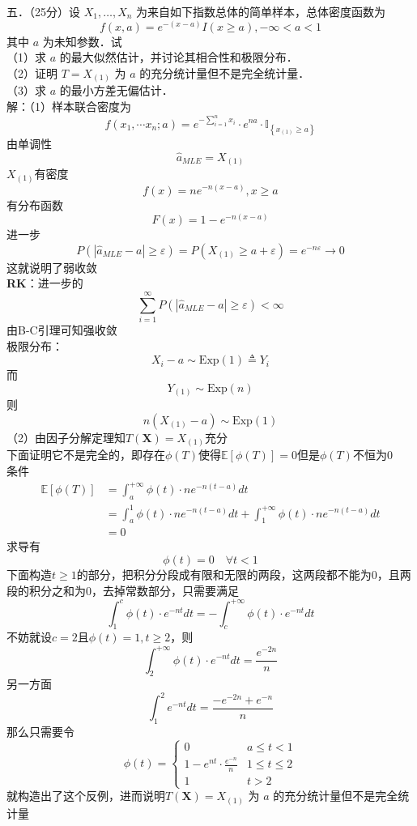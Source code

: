 \documentclass[UTF8]{ctexart}
\begin{document}
\noindent 五．（25分）设 $X_1, \ldots, X_n$ 为来自如下指数总体的简单样本，总体密度函数为
$$
f(x , a)=e^{-(x-a)} I(x \geq a),-\infty<a<1
$$
其中 $a$ 为未知参数．试\\
（1）求 $a$ 的最大似然估计，并讨论其相合性和极限分布．\\
（2）证明 $T=X_{(1)}$ 为 $a$ 的充分统计量但不是完全统计量．\\
（3）求 $a$ 的最小方差无偏估计．\\
解：（1）样本联合密度为
\[
f\left(x_1, \cdots x_n ; a\right)=e^{-\sum_{i=1}^n x_i} \cdot e^{n a} \cdot \mathbb{I}_{\left\{x_{(1)} \geq a\right\}}
\]
由单调性
\[
\hat{a}_{MLE}=X_{(1)}
\]
$X_{(1)}$有密度
\[
f(x)=ne^{-n(x-a)},x\ge a
\]
有分布函数
\[
F(x)=1-e^{-n(x-a)}
\]
进一步
\[
P\left(\left|\hat{a}_{M L E}-a\right| \geqslant \varepsilon\right)=P(X_{(1)} \geqslant a+\varepsilon)=e^{-n \varepsilon} \rightarrow 0
\]
这就说明了弱收敛\\
\textbf{RK}：进一步的
\[
\sum\limits_{i=1}^{\infty} P\left(\left|\hat{a}_{M L E}-a\right| \geqslant \varepsilon\right)<\infty
\]
由B-C引理可知强收敛\\
极限分布：
\[
X_i-a\sim \mathrm{Exp}(1)\triangleq Y_i
\]
而
\[
Y_{(1)}\sim \mathrm{Exp}(n)
\]
则
\[
n(X_{(1)}-a)\sim \mathrm{Exp}(1)
\]
（2）由因子分解定理知$T(\boldsymbol{X})=X_{(1)}$充分\\
下面证明它不是完全的，即存在$\phi(T)$使得$\mathbb{E}[\phi(T)]=0$但是$\phi(T)$不恒为0\\
条件
\[
\begin{aligned}
	\mathbb{E}[\phi(T)]&=\int_a^{+\infty} \phi(t) \cdot n e^{-n(t-a)} d t\\
	&=\int_a^{1} \phi(t) \cdot n e^{-n(t-a)} d t+\int_1^{+\infty} \phi(t) \cdot n e^{-n(t-a)} d t\\
	&=0
\end{aligned}
\]
求导有
\[
\phi(t)=0\quad \forall t<1
\]
下面构造$t\ge 1$的部分，把积分分段成有限和无限的两段，这两段都不能为0，且两段的积分之和为0，去掉常数部分，只需要满足
\[
\int_1^{c} \phi(t) \cdot  e^{-nt} d t=-\int_c^{+\infty} \phi(t) \cdot  e^{-nt} d t
\]
不妨就设$c=2$且$\phi(t)=1,t\ge 2$，则
\[
\int_2^{+\infty} \phi(t) \cdot  e^{-nt} d t=\frac{e^{-2n}}{n}
\]
另一方面
\[
\int_1^{2}    e^{-nt} d t=\frac{-e^{-2n}+e^{-n}}{n}
\]
那么只需要令
\[
\phi(t)=
\begin{cases}
	0 & a\le t<1\\
	1-e^{nt}\cdot \frac{e^{-n}}{n}   &  1\le t\le 2\\
	1  &  t>2
\end{cases}
\]
就构造出了这个反例，进而说明$T(\boldsymbol{X})=X_{(1)}$ 为 $a$ 的充分统计量但不是完全统计量\\
\end{document}
